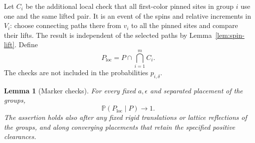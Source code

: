 \documentclass[11pt]{article}
\newtheorem{lemma}[theorem]{Lemma}
\theoremstyle{definition}
\theoremstyle{remark}
\numberwithin{equation}{section}
\begin{document}
Let $C_i$ be the additional local check that all first-color pinned
sites in group $i$ use one and the same lifted pair.  It is an event
of the spins and relative increments in $V_i$: choose connecting paths
there from $v_i$ to all the pinned sites and compare their lifts.
The result is independent of the selected paths by
Lemma~\ref{lem:spin-lift}.  Define
\begin{equation}\label{pins:checked-event}
 P_{\mathrm{loc}}=P\cap\bigcap_{i=1}^m C_i.
\end{equation}
The checks are not included in the probabilities $p_{i,\delta}$.

\begin{lemma}[Marker checks]\label{pins:marker-checks}
For every fixed $a,\epsilon$ and separated placement of the groups,
\begin{equation}\label{pins:check-success}
 \mathbb P(P_{\mathrm{loc}}\mid P)\longrightarrow1.
\end{equation}
The assertion holds also after any fixed rigid translations or lattice
reflections of the groups, and along converging placements that retain
the specified positive clearances.
\end{lemma}
\end{document}
